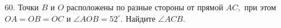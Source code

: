 60. Точки $B$ и $O$ расположены по разные стороны от прямой $AC,$ при этом  $OA=OB=OC$ и $\angle AOB = 52^\circ.$ Найдите $\angle ACB.$\\
